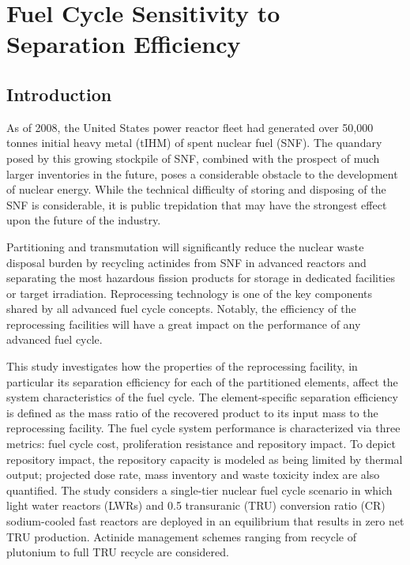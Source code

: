 \chapter{Fuel Cycle Sensitivity to Separation Efficiency}
\label{ses_paper}



\section{Introduction}
\label{ses_sec:intro}
As of 2008, the United States power reactor fleet had generated over
50,000 tonnes initial heavy metal (tIHM) of spent nuclear fuel (SNF). 
The quandary posed by this growing stockpile of SNF, combined with the
prospect of much larger inventories in the future, poses a considerable
obstacle to the development of nuclear energy.  While the technical
difficulty of storing and disposing of the SNF is considerable, it is
public trepidation that may have the strongest effect upon the future of
the industry.  

Partitioning and transmutation will significantly reduce the nuclear
waste disposal burden by recycling actinides from SNF in advanced
reactors and separating the most hazardous fission products for storage
in dedicated facilities or target irradiation.  Reprocessing technology
is one of the key components shared by all advanced fuel cycle concepts.
 Notably, the efficiency of the reprocessing facilities will have a
great impact on the performance of any advanced fuel cycle. 

This study investigates how the properties of the reprocessing facility,
in particular its separation efficiency for each of the partitioned
elements, affect the system characteristics of the fuel cycle. The
element-specific separation efficiency is defined as the mass ratio of
the recovered product to its input mass to the reprocessing facility. 
The fuel cycle system performance is characterized via three metrics:
fuel cycle cost, proliferation resistance and repository impact.  To
depict repository impact, the repository capacity is modeled as being
limited by thermal output; projected dose rate, mass inventory and waste
toxicity index are also quantified.  The study considers a single-tier
nuclear fuel cycle scenario in which light water reactors (LWRs) and 0.5
transuranic (TRU) conversion ratio (CR) sodium-cooled fast reactors are
deployed in an equilibrium that results in zero net TRU production. 
Actinide management schemes ranging from recycle of plutonium to full
TRU recycle are considered.

